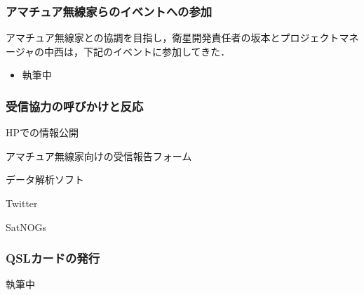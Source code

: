 \subsubsection{アマチュア無線家らのイベントへの参加}
アマチュア無線家との協調を目指し，衛星開発責任者の坂本とプロジェクトマネージャの中西は，下記のイベントに参加してきた．
\begin{itemize}
	\item 執筆中
\end{itemize}

\subsubsection{受信協力の呼びかけと反応}
HPでの情報公開

アマチュア無線家向けの受信報告フォーム

データ解析ソフト

Twitter

SatNOGs

\subsubsection{QSLカードの発行}

執筆中